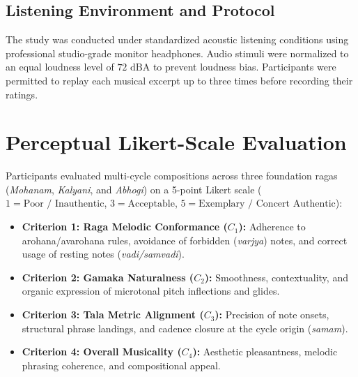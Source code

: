 \documentclass[11pt,a4paper]{article}
\begin{document}
\subsection{Listening Environment and Protocol}
The study was conducted under standardized acoustic listening conditions using professional studio-grade monitor headphones. Audio stimuli were normalized to an equal loudness level of $72\text{ dBA}$ to prevent loudness bias. Participants were permitted to replay each musical excerpt up to three times before recording their ratings.

\section{Perceptual Likert-Scale Evaluation}

Participants evaluated multi-cycle compositions across three foundation ragas (\textit{Mohanam}, \textit{Kalyani}, and \textit{Abhogi}) on a 5-point Likert scale ($1 = \text{Poor / Inauthentic}$, $3 = \text{Acceptable}$, $5 = \text{Exemplary / Concert Authentic}$):
\begin{itemize}
    \item \textbf{Criterion 1: Raga Melodic Conformance ($C_1$):} Adherence to arohana/avarohana rules, avoidance of forbidden (\textit{varjya}) notes, and correct usage of resting notes (\textit{vadi/samvadi}).
    \item \textbf{Criterion 2: Gamaka Naturalness ($C_2$):} Smoothness, contextuality, and organic expression of microtonal pitch inflections and glides.
    \item \textbf{Criterion 3: Tala Metric Alignment ($C_3$):} Precision of note onsets, structural phrase landings, and cadence closure at the cycle origin (\textit{samam}).
    \item \textbf{Criterion 4: Overall Musicality ($C_4$):} Aesthetic pleasantness, melodic phrasing coherence, and compositional appeal.
\end{itemize}
\end{document}
